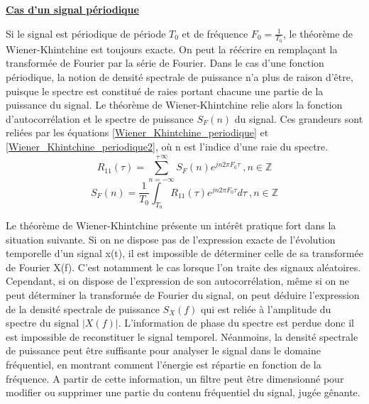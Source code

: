 	
	\vspace{1\baselineskip}
	\textbf{\underline{Cas d'un signal périodique}}
	
	Si le signal est périodique de période $T_{0}$ et de fréquence $F_{0}=\frac{1}{T_{0}}$, le théorème de Wiener-Khintchine est toujours exacte. On peut la réécrire en remplaçant la transformée de Fourier par la série de Fourier. Dans le cas d'une fonction périodique, la notion de densité spectrale de puissance n'a plus de raison d'être, puisque le spectre est constitué de raies portant chacune une partie de la puissance du signal. Le théorème de Wiener-Khintchine relie alors la fonction d'autocorrélation et le spectre de puissance $S_{F}(n)$ du signal. Ces grandeurs sont reliées par les équations \ref{Wiener_Khintchine_periodique} et \ref{Wiener_Khintchine_periodique2}, où n est l'indice d'une raie du spectre.
	\begin{equation}\label{Wiener_Khintchine_periodique}
		R_{11}(\tau) = \sum_{n=-\infty}^{+\infty}S_{F}(n)e^{jn2\pi F_{0}\tau}~,n\in \mathbb{Z}
	\end{equation}
	\begin{equation}\label{Wiener_Khintchine_periodique2}
	S_{F}(n) = \frac{1}{T_{0}}\int_{T_{0}}R_{11}(\tau)e^{jn2\pi F_{0}\tau}d\tau	~,n\in \mathbb{Z}
	\end{equation}
	  
	
	\vspace{1\baselineskip}
	
	Le théorème de Wiener-Khintchine présente un intérêt pratique fort dans la situation suivante. Si on ne dispose pas de l'expression exacte de l'évolution temporelle d'un signal x(t), il est impossible de déterminer celle de sa transformée de Fourier X(f). C'est notamment le cas lorsque l'on traite des signaux aléatoires.	Cependant, si on dispose de l'expression de son autocorrélation, même si on ne peut déterminer la transformée de Fourier du signal, on peut déduire l'expression de la densité spectrale de puissance $S_{X}(f)$ qui est reliée à l'amplitude du spectre du signal $|X(f)|$. L'information de phase du spectre est perdue donc il est impossible de reconstituer le signal temporel. Néanmoins, la densité spectrale de puissance peut être suffisante pour analyser le signal dans le domaine fréquentiel, en montrant comment l'énergie est répartie en fonction de la fréquence. A partir de cette information, un filtre peut être dimensionné pour modifier ou supprimer une partie du contenu fréquentiel du signal, jugée gênante.
	
	\vspace{1\baselineskip}
	
